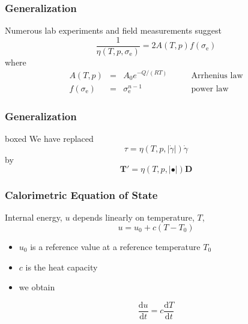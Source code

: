 \documentclass[hide notes,intlimits]{beamer}
\begin{document}
\begin{frame}
  \frametitle{Generalization}
  Numerous lab experiments and field measurements suggest
    \begin{equation}
      \frac{1}{\eta\left(T,p,\sigma_{\text{e}}\right)} =2A\left(T,p\right)f\left(\sigma_{\text{e}}\right)
    \end{equation}
    where
    \begin{equation*}
      \begin{array}{rcll}
      A(T,p) & = & A_{0} e^{-Q/(RT)} &\qquad \text{Arrhenius law}\\[.25em]
      f\left(\sigma_{\text{e}}\right) & = &\sigma_{\text{e}}^{n-1} &\qquad \text{power law}
      \end{array}
    \end{equation*}
\end{frame}


\begin{frame}
  \frametitle{Generalization}
   \begin{beamercolorbox}[rounded=true,shadow=true]{boxed}
     We have replaced
     \begin{equation}
       \tau = \eta\left(T,p,\vert \dot\gamma \vert\right)\dot\gamma
     \end{equation}
     by
     \begin{equation}
       \mathbf{T}' = \eta\left(T,p,\vert \bullet \vert\right)\mathbf{D}
     \end{equation}  
   \end{beamercolorbox}
 \end{frame}


\begin{frame}
  \frametitle{Calorimetric Equation of State}
  Internal energy, $u$ depends linearly on temperature, $T$,
  \begin{equation}
    u = u_{0} + c\left(T-T_{0}\right)
  \end{equation}
  \begin{itemize}
  \item $u_{0}$ is a reference value at a reference temperature $T_{0}$
  \item $c$ is the heat capacity
  \item we obtain
  \end{itemize}
  \begin{equation}
    \frac{\text{d} u}{\text{d} t} =     c \frac{\text{d} T}{\text{d} t} 
  \end{equation}
\end{frame}
\end{document}
